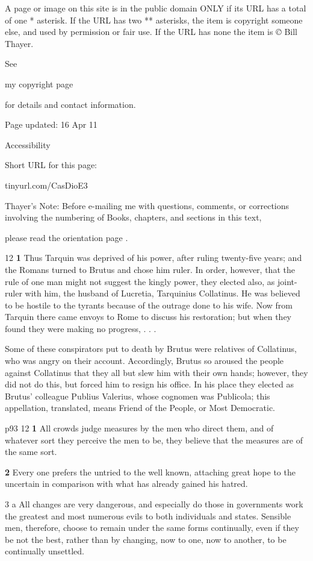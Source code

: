A page or image on this site is in the public domain ONLY if its URL has a total of one * asterisk. If the URL has two ** asterisks, the item is copyright someone else, and used by permission or fair use. If the URL has none the item is \emph{©} Bill Thayer.

See

my copyright page

for details and contact information.

Page updated:
16 Apr 11

Accessibility


Short URL for this page:

tinyurl.com/CasDioE3

Thayer's Note: Before e-mailing me with questions, comments, or corrections involving the numbering of Books, chapters, and sections in this text,

please read the orientation page .

12
\textbf{1} Thus Tarquin was deprived of his power, after ruling twenty-five years; and the Romans turned to Brutus and chose him ruler. In order, however, that the rule of one man might not suggest the kingly power, they elected also, as joint-ruler with him, the husband of Lucretia, Tarquinius Collatinus. He was believed to be hostile to the tyrants because of the outrage done to his wife. Now from Tarquin there came envoys to Rome to discuss his restoration; but when they found they were making no progress, . . .

Some of these conspirators put to death by Brutus were relatives of Collatinus, who was angry on their account. Accordingly, Brutus so aroused the people against Collatinus that they all but slew him with their own hands; however, they did not do this, but forced him to resign his office. In his place they elected as Brutus' colleague Publius Valerius, whose cognomen was Publicola; this appellation, translated, means Friend of the People, or Most Democratic.

p93
12
\textbf{1} All crowds judge measures by the men who direct them, and of whatever sort they perceive the men to be, they believe that the measures are of the same sort.

\textbf{2}
Every one prefers the untried to the well known, attaching great hope to the uncertain in comparison with what has already gained his hatred.

3 a All changes are very dangerous, and especially do those in governments work the greatest and most numerous evils to both individuals and states. Sensible men, therefore, choose to remain under the same forms continually, even if they be not the best, rather than by changing, now to one, now to another, to be continually unsettled.

